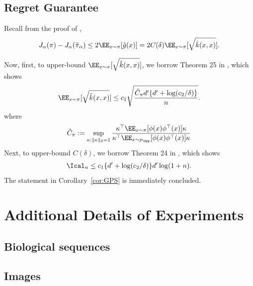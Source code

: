 \subsection{Regret Guarantee}

Recall from the proof of , 
\begin{align*}
    J_{\alpha}(\pi)- J_{\alpha}(\hat \pi_\alpha) \leq 2\EE_{x\sim \pi} [\hat g(x)]=2C(\delta) \EE_{x\sim \pi} [\sqrt{\hat k(x,x)} ]. 
\end{align*}

Now, first, to upper-bound $\EE_{x\sim \pi} [\sqrt{\hat k(x,x)} ]$, we borrow Theorem 25 in \citep{chang2021mitigating}, which shows 
\begin{align*}
    \EE_{x\sim \pi} [\sqrt{\hat k(x,x)} ]\leq c_1\sqrt{\frac{\tilde C_{\pi}d'\{d' + \log(c_2/\delta) \}}{n} }. 
\end{align*}
where 
\begin{align*}
\tilde C_{\pi}:=\sup_{\kappa:\|\kappa \|_2=1 }\frac{\kappa ^{\top}\EE_{x\sim \pi}[\phi(x) \phi^{\top}(x) ] \kappa}{\kappa ^{\top} \EE_{x\sim p_{\spp}}[\phi(x) \phi^{\top}(x)] \kappa}
\end{align*} 
Next, to upper-bound $C(\delta)$, we borrow Theorem 24 in \citep{chang2021mitigating}, which shows 
\begin{align*}
    \Ical_n \leq c_1\{d' + \log(c_2/\delta)\}d'\log(1+n). 
\end{align*}
The statement in Corollary~\ref{cor:GPS} is immediately concluded. 


\section{Additional Details of Experiments} \label{sec:experiments}

\subsection{Biological sequences}

\subsection{Images}
